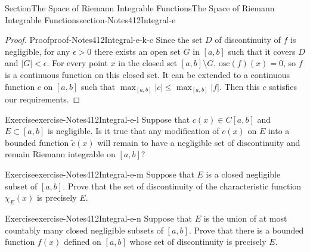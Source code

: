 \documentclass[oneside,10pt,]{article}
\numberwithin{equation}{section}
\newcommand{\osc}{\text{osc}}
\begin{document}
\begin{sectionptx}{Section}{The Space of Riemann Integrable Functions}{}{The Space of Riemann Integrable Functions}{}{}{section-Notes412Integral-e}
\begin{proof}{Proof}{}{proof-Notes412Integral-e-k-c}
Since the set \(D\) of discontinuity of \(f\) is negligible, for any \(\epsilon > 0\) there exists  an open set \(G\) in \([a, b]\) such that it covers \(D\) and \(|G| < \epsilon\). For every point \(x\) in the closed set \([a, b]\setminus G\), \(\osc(f)(x)=0\), so \(f\) is a continuous function on this closed set.   It can be extended to a continuous function \(c\) on \([a, b]\) such that \(\max_{[a, b]}|c| \le \max_{[a,b]}|f|\). Then this \(c\) satisfies our requirements.\end{proof}
\begin{inlineexercise}{Exercise}{}{exercise-Notes412Integral-e-l}%
Suppose that \(c(x)\in C[a, b]\) and \(E\subset [a, b]\) is negligible. Is it true that any modification of \(c(x)\) on \(E\) into a bounded  function \(\tilde c(x)\) will remain to have a negligible set of discontinuity and remain Riemann integrable on \([a, b]\)?%
\end{inlineexercise}%
\begin{inlineexercise}{Exercise}{}{exercise-Notes412Integral-e-m}%
Suppose that \(E\) is a closed negligible subset of \([a, b]\). Prove that the set of discontinuity of the characteristic function \(\chi_{E}(x)\) is precisely \(E\).%
\end{inlineexercise}%
\begin{inlineexercise}{Exercise}{}{exercise-Notes412Integral-e-n}%
Suppose that \(E\) is the union of at most countably many closed negligible subsets of \([a, b]\). Prove that there is a bounded function \(f(x)\) defined on \([a, b]\) whose set of discontinuity is precisely \(E\).%
\end{inlineexercise}%
\end{sectionptx}
%
%
\typeout{************************************************}
\typeout{************************************************}
%
\end{document}
